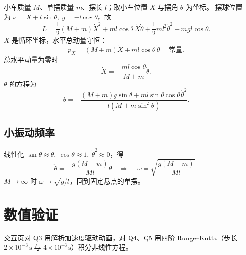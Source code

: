 \documentclass[UTF8,a4paper,11pt]{ctexart}
\begin{document}
小车质量 $M$、单摆质量 $m$、摆长 $l$；取小车位置 $X$ 与摆角 $\theta$ 为坐标。
摆球位置为 $x=X+l\sin\theta,\ y=-l\cos\theta$，故
\begin{equation}
  L=\frac12(M+m)\dot X^2+ml\cos\theta\,\dot X\dot\theta+\frac12ml^2\dot\theta^2+mgl\cos\theta .
  \label{eq:c-L}
\end{equation}
$X$ 是循环坐标，水平总动量守恒：
\begin{equation}
  p_X=(M+m)\dot X+ml\cos\theta\,\dot\theta=\text{常量}.
  \label{eq:c-pX}
\end{equation}
总水平动量为零时
\begin{equation}
  \dot X=-\frac{ml\cos\theta}{M+m}\dot\theta .
  \label{eq:c-Xdot}
\end{equation}
$\theta$ 的方程为
\begin{equation}
  \ddot\theta=-\frac{(M+m)g\sin\theta+ml\sin\theta\cos\theta\,\dot\theta^2}
  {l\left(M+m\sin^2\theta\right)}.
  \label{eq:c-th}
\end{equation}

\subsection{小振动频率}

线性化 $\sin\theta\approx\theta,\ \cos\theta\approx1,\ \dot\theta^2\approx0$，得
\begin{equation}
  \ddot\theta=-\frac{g(M+m)}{Ml}\theta
  \quad\Longrightarrow\quad
  \boxed{\ \omega=\sqrt{\frac{g(M+m)}{Ml}}\ }.
  \label{eq:c-omega}
\end{equation}
$M\to\infty$ 时 $\omega\to\sqrt{g/l}$，回到固定悬点的单摆。

\section{数值验证}\label{sec:numeric}

交互页对 Q3 用解析加速度驱动动画，对 Q4、Q5 用四阶 Runge--Kutta（步长
$2\times10^{-3}\,\mathrm{s}$ 与 $4\times10^{-3}\,\mathrm{s}$）积分非线性方程。
\end{document}
